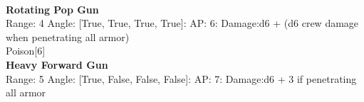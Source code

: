 \ \\
{\bf Rotating Pop Gun } \\



Range: 4  Angle: [True, True, True, True]: AP: 6: Damage:d6 + (d6 crew damage when penetrating all armor) \\
Poison[6]\\ 




{\bf Heavy Forward Gun } \\



Range: 5  Angle: [True, False, False, False]: AP: 7: Damage:d6 + 3 if penetrating all armor \\




 
\ \\



